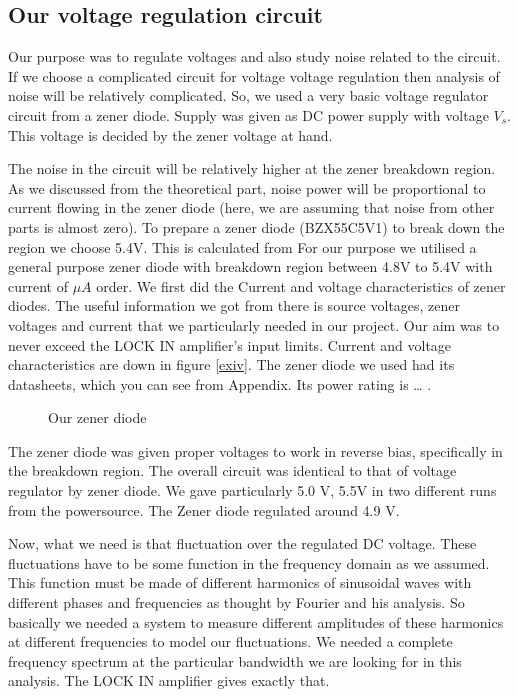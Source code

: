 
\subsection{Our voltage regulation circuit}

Our purpose was to regulate voltages and also study noise related to the circuit. If we choose a complicated circuit for voltage voltage regulation then analysis of noise will be relatively complicated. So, we used a very basic voltage regulator circuit from a zener diode. Supply was given as DC power supply with voltage $V_{s}$. This voltage is decided by the zener voltage at hand.

The noise in the circuit will be relatively higher at the zener breakdown region. As we discussed from the theoretical part, noise power will be proportional to current flowing in the zener diode (here, we are assuming that noise from other parts is almost zero). To prepare a zener diode (BZX55C5V1) to break down the region we choose 5.4V. This is calculated from 
For our purpose we utilised a general purpose zener diode with breakdown region between 4.8V to 5.4V with current of $\mu A$ order. We first did the Current and voltage characteristics of zener diodes. The useful information we got from there is source voltages, zener voltages and current that we particularly needed in our project. Our aim was to never exceed the LOCK IN amplifier’s input limits. Current and voltage characteristics are down in figure \ref{exiv}. The zener diode we used had its datasheets, which you can see from Appendix. Its power rating is … .\cite{mjntr101}

\begin{figure}[hbt!]
\caption{Our zener diode}
\end{figure}

The zener diode was given proper voltages to work in reverse bias, specifically in the breakdown region. The overall circuit was identical to that of voltage regulator by zener diode. We gave particularly 5.0 V, 5.5V in two different runs from the powersource. The Zener diode regulated around 4.9 V. 

\begin{figure*}[hbt!]
\caption{current and voltage characterists of zener diode \label{exiv}}
\end{figure*}

Now, what we need is that fluctuation over the regulated DC voltage. These fluctuations have to be some function in the frequency domain as we assumed. This function must be made of different harmonics of sinusoidal waves with different phases and frequencies as thought by Fourier and his analysis. So basically we needed a system to measure different amplitudes of these harmonics at different frequencies to model our fluctuations. We needed a complete frequency spectrum at the particular bandwidth we are looking for in this analysis. The LOCK IN amplifier gives exactly that. 

